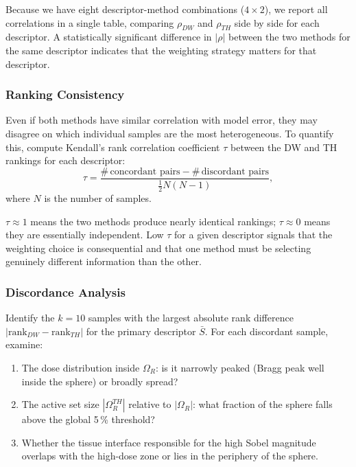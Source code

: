 \documentclass[11pt,a4paper]{article}
\begin{document}
Because we have eight descriptor-method combinations ($4 \times 2$), we
report all correlations in a single table, comparing $\rho_{DW}$ and
$\rho_{TH}$ side by side for each descriptor.
A statistically significant difference in $|\rho|$ between the two methods
for the same descriptor indicates that the weighting strategy matters for
that descriptor.

\subsubsection{Ranking Consistency}

Even if both methods have similar correlation with model error, they may
disagree on which individual samples are the most heterogeneous.
To quantify this, compute Kendall's rank correlation coefficient $\tau$
between the DW and TH rankings for each descriptor:
\begin{equation}
    \tau = \frac{\#\,\text{concordant pairs} - \#\,\text{discordant pairs}}
               {\tfrac{1}{2}N(N-1)},
\end{equation}
where $N$ is the number of samples.

$\tau \approx 1$ means the two methods produce nearly identical rankings;
$\tau \approx 0$ means they are essentially independent.
Low $\tau$ for a given descriptor signals that the weighting choice is
consequential and that one method must be selecting genuinely different
information than the other.

\subsubsection{Discordance Analysis}
\label{sec:discordance}

Identify the $k = 10$ samples with the largest absolute rank difference
$|\mathrm{rank}_{DW} - \mathrm{rank}_{TH}|$ for the primary descriptor
$\bar{S}$.
For each discordant sample, examine:
\begin{enumerate}
    \item The dose distribution inside $\Omega_R$: is it narrowly peaked (Bragg
          peak well inside the sphere) or broadly spread?
    \item The active set size $|\Omega_R^{TH}|$ relative to $|\Omega_R|$: what
          fraction of the sphere falls above the global 5\,\% threshold?
    \item Whether the tissue interface responsible for the high Sobel magnitude
          overlaps with the high-dose zone or lies in the periphery of the
          sphere.
\end{enumerate}
\end{document}
